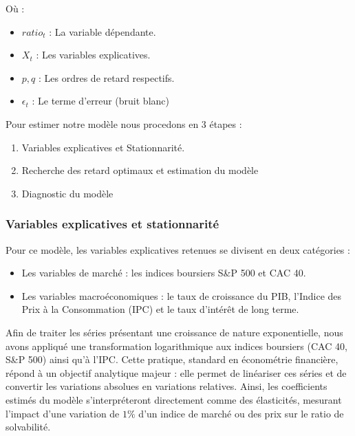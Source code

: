 \documentclass[
]{article}
\providecommand{\tightlist}{%
  \setlength{\itemsep}{0pt}\setlength{\parskip}{0pt}}
\begin{document}
Où :

\begin{itemize}
\tightlist
\item
  \(ratio_{t}\) : La variable dépendante.
\item
  \(X_{t}\) : Les variables explicatives.
\item
  \(p, q\) : Les ordres de retard respectifs.
\item
  \(\epsilon_{t}\) : Le terme d'erreur (bruit blanc)
\end{itemize}

Pour estimer notre modèle nous procedons en 3 étapes :

\begin{enumerate}
\def\labelenumi{\arabic{enumi}.}
\tightlist
\item
  Variables explicatives et Stationnarité.
\item
  Recherche des retard optimaux et estimation du modèle
\item
  Diagnostic du modèle
\end{enumerate}

\subsubsection{Variables explicatives et
stationnarité}\label{variables-explicatives-et-stationnarituxe9}

Pour ce modèle, les variables explicatives retenues se divisent en deux
catégories :

\begin{itemize}
\tightlist
\item
  Les variables de marché : les indices boursiers S\&P 500 et CAC 40.
\item
  Les variables macroéconomiques : le taux de croissance du PIB,
  l'Indice des Prix à la Consommation (IPC) et le taux d'intérêt de long
  terme.
\end{itemize}

Afin de traiter les séries présentant une croissance de nature
exponentielle, nous avons appliqué une transformation logarithmique aux
indices boursiers (CAC 40, S\&P 500) ainsi qu'à l'IPC. Cette pratique,
standard en économétrie financière, répond à un objectif analytique
majeur : elle permet de linéariser ces séries et de convertir les
variations absolues en variations relatives. Ainsi, les coefficients
estimés du modèle s'interpréteront directement comme des élasticités,
mesurant l'impact d'une variation de \(1 \%\) d'un indice de marché ou
des prix sur le ratio de solvabilité.
\end{document}

